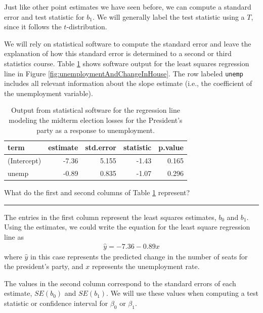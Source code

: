 \documentclass[
  10pt,
  openany]{book}
\theoremstyle{definition}
\theoremstyle{definition}
\theoremstyle{definition}
\theoremstyle{definition}
\theoremstyle{remark}
\begin{document}
Just like other point estimates we have seen before, we can compute a
standard error and test statistic for \(b_1\). We will generally label the
test statistic using a \(T\), since it follows the \(t\)-distribution.

We will rely on statistical software to compute the standard error and
leave the explanation of how this standard error is determined to a
second or third statistics course.
Table \ref{tab:midtermUnempRegTable} shows software output for the least
squares regression line in Figure \ref{fig:unemploymentAndChangeInHouse}. The row labeled \texttt{unemp} includes all relevant information about the slope estimate (i.e., the coefficient of the unemployment variable).

\begin{table}
\centering
\caption{\label{tab:midtermUnempRegTable}Output from statistical software for the regression
    line modeling the midterm election losses for the
    President's party as a response to unemployment.}
\centering
\begin{tabular}[t]{l|r|r|r|r}
\hline
term & estimate & std.error & statistic & p.value\\
\hline
(Intercept) & -7.36 & 5.155 & -1.43 & 0.165\\
\hline
unemp & -0.89 & 0.835 & -1.07 & 0.296\\
\hline
\end{tabular}
\end{table}

What do the first and second columns of Table \ref{tab:midtermUnempRegTable} represent?

\begin{center}\rule{0.5\linewidth}{0.5pt}\end{center}

The entries in the first column represent the least squares estimates, \(b_0\) and \(b_1\). Using the estimates, we could write the equation for the least
square regression line as \[\begin{aligned}
  \hat{y} = -7.36 - 0.89 x
  \end{aligned}\] where \(\hat{y}\) in this case represents the predicted
change in the number of seats for the president's party, and \(x\)
represents the unemployment rate.

The values in the second column correspond to the standard errors of each
estimate, \(SE(b_0)\) and \(SE(b_1)\). We will use these values when computing a test statistic or confidence interval for \(\beta_0\) or \(\beta_1\).
\end{document}
